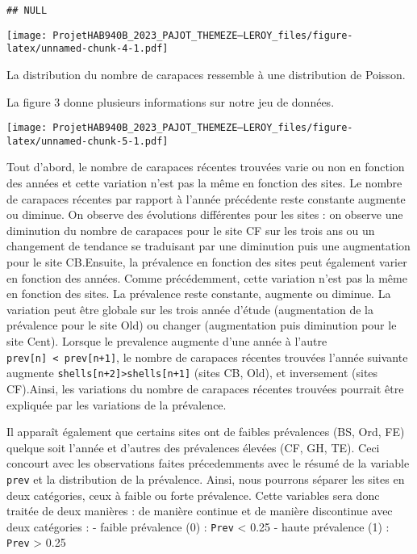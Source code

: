 \documentclass[
]{article}
\begin{document}
\begin{verbatim}
## NULL
\end{verbatim}

\texttt{[image: ProjetHAB940B\_2023\_PAJOT\_THEMEZE--LEROY\_files/figure-latex/unnamed-chunk-4-1.pdf]}

La distribution du nombre de carapaces ressemble à une distribution de
Poisson.

La figure 3 donne plusieurs informations sur notre jeu de données.

\texttt{[image: ProjetHAB940B\_2023\_PAJOT\_THEMEZE--LEROY\_files/figure-latex/unnamed-chunk-5-1.pdf]}

Tout d'abord, le nombre de carapaces récentes trouvées varie ou non en
fonction des années et cette variation n'est pas la même en fonction des
sites. Le nombre de carapaces récentes par rapport à l'année précédente
reste constante augmente ou diminue. On observe des évolutions
différentes pour les sites : on observe une diminution du nombre de
carapaces pour le site CF sur les trois ans ou un changement de tendance
se traduisant par une diminution puis une augmentation pour le site
CB.\newline Ensuite, la prévalence en fonction des sites peut également
varier en fonction des années. Comme précédemment, cette variation n'est
pas la même en fonction des sites. La prévalence reste constante,
augmente ou diminue. La variation peut être globale sur les trois année
d'étude (augmentation de la prévalence pour le site Old) ou changer
(augmentation puis diminution pour le site Cent). Lorsque le prevalence
augmente d'une année à l'autre
\texttt{prev{[}n{]}\ \textless{}\ prev{[}n+1{]}}, le nombre de carapaces
récentes trouvées l'année suivante augmente
\texttt{shells{[}n+2{]}\textgreater{}shells{[}n+1{]}} (sites CB, Old),
et inversement (sites CF).\newline Ainsi, les variations du nombre de
carapaces récentes trouvées pourrait être expliquée par les variations
de la prévalence.

Il apparaît également que certains sites ont de faibles prévalences (BS,
Ord, FE) quelque soit l'année et d'autres des prévalences élevées (CF,
GH, TE). Ceci concourt avec les observations faites précedemments avec
le résumé de la variable \texttt{prev} et la distribution de la
prévalence. Ainsi, nous pourrons séparer les sites en deux catégories,
ceux à faible ou forte prévalence. Cette variables sera donc traitée de
deux manières : de manière continue et de manière discontinue avec deux
catégories : - faible prévalence (0) : \texttt{Prev} \textless{} 0.25 -
haute prévalence (1) : \texttt{Prev} \textgreater{} 0.25
\end{document}
